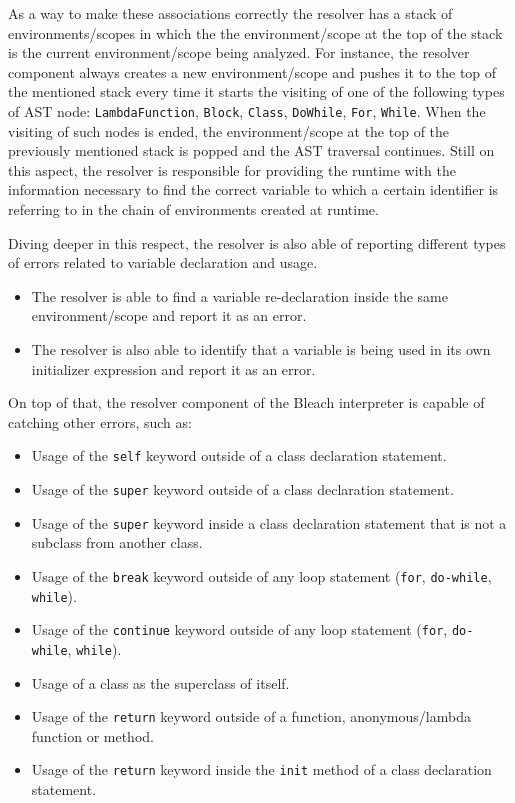 As a way to make these associations correctly the resolver has a stack of environments/scopes in which the the environment/scope at the top of the stack is the current environment/scope being analyzed. For instance, the resolver component always creates a new environment/scope and pushes it to the top of the mentioned stack every time it starts the visiting of one of the following types of AST node: \texttt{LambdaFunction}, \texttt{Block}, \texttt{Class}, \texttt{DoWhile}, \texttt{For}, \texttt{While}. When the visiting of such nodes is ended, the environment/scope at the top of the previously mentioned stack is popped and the AST traversal continues. Still on this aspect, the resolver is responsible for providing the runtime with the information necessary to find the correct variable to which a certain identifier is referring to in the chain of environments created at runtime.

Diving deeper in this respect, the resolver is also able of reporting different types of errors related to variable declaration and usage.
\begin{itemize}
    \item The resolver is able to find a variable re-declaration inside the same environment/scope and report it as an error.
    \item The resolver is also able to identify that a variable is being used in its own initializer expression and report it as an error.   
\end{itemize}

On top of that, the resolver component of the Bleach interpreter is capable of catching other errors, such as:
\begin{itemize}
    \item Usage of the \texttt{self} keyword outside of a class declaration statement.
    \item Usage of the \texttt{super} keyword outside of a class declaration statement.
    \item Usage of the \texttt{super} keyword inside a class declaration statement that is not a subclass from another class.
    \item Usage of the \texttt{break} keyword outside of any loop statement (\texttt{for}, \texttt{do-while}, \texttt{while}).
    \item Usage of the \texttt{continue} keyword outside of any loop statement (\texttt{for}, \texttt{do-while}, \texttt{while}).
    \item Usage of a class as the superclass of itself.
    \item Usage of the \texttt{return} keyword outside of a function, anonymous/lambda function or method.
    \item Usage of the \texttt{return} keyword inside the \texttt{init} method of a class declaration statement.
\end{itemize}

